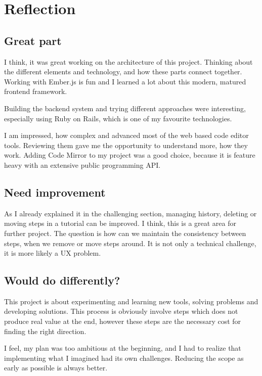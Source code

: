 \documentclass[11pt, a4paper, oneside, openright, medskipamount]{report}
\begin{document}
\section{Reflection}

\subsection{Great part}

I think, it was great working on the architecture of this project. Thinking about the different elements and technology, and how these parts connect together. Working with Ember.js is fun and I learned a lot about this modern, matured frontend framework.

Building the backend system and trying different approaches were interesting, especially using Ruby on Rails, which is one of my favourite technologies.

I am impressed, how complex and advanced most of the web based code editor tools. Reviewing them gave me the opportunity to understand more, how they work. Adding Code Mirror to my project was a good choice, because it is feature heavy with an extensive public programming API.

\subsection {Need improvement}

As I already explained it in the challenging section, managing history, deleting or moving steps in a tutorial can be improved. I think, this is a great area for further project. The question is how can we maintain the consistency between steps, when we remove or move steps around. It is not only a technical challenge, it is more likely a UX problem.

\subsection {Would do differently?}

This project is about experimenting and learning new tools, solving problems and developing solutions. This process is obviously involve steps which does not produce real value at the end, however these steps are the necessary cost for finding the right direction.

I feel, my plan was too ambitious at the beginning, and I had to realize that implementing what I imagined had its own challenges. Reducing the scope as early as possible is always better.
\end{document}
